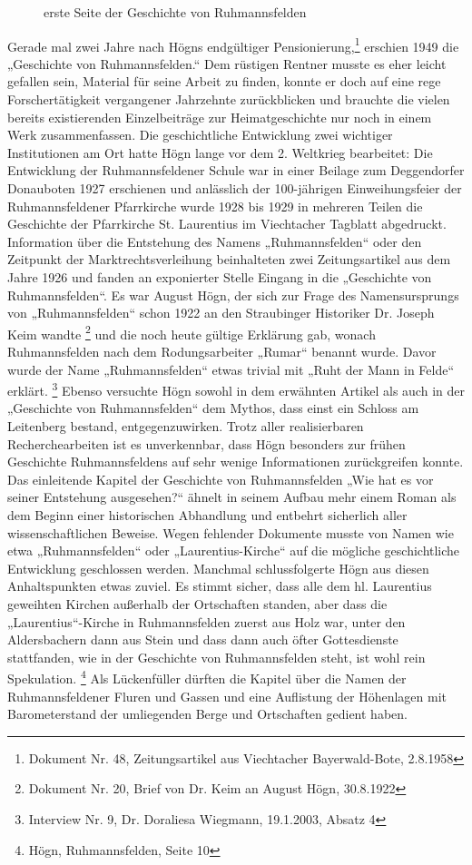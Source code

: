 \begin{figure}
\caption{erste Seite der Geschichte von Ruhmannsfelden}
\end{figure}

Gerade mal zwei Jahre nach Högns endgültiger Pensionierung,\footnote{
Dokument Nr. 48, Zeitungsartikel aus Viechtacher Bayerwald-Bote,
2.8.1958} erschien 1949 die „Geschichte von Ruhmannsfelden.“ Dem
rüstigen Rentner musste es eher leicht gefallen sein, Material für
seine Arbeit zu finden, konnte er doch auf eine rege Forschertätigkeit
vergangener Jahrzehnte zurückblicken und brauchte die vielen bereits
existierenden Einzelbeiträge zur Heimatgeschichte nur noch in einem
Werk zusammenfassen. Die geschichtliche Entwicklung zwei wichtiger
Institutionen am Ort hatte Högn lange vor dem 2. Weltkrieg bearbeitet:
Die Entwicklung der Ruhmannsfeldener Schule war in einer Beilage zum
Deggendorfer Donauboten 1927 erschienen und anlässlich der 100-jährigen
Einweihungsfeier der Ruhmannsfeldener Pfarrkirche wurde 1928 bis 1929
in mehreren Teilen die Geschichte der Pfarrkirche St. Laurentius im
Viechtacher Tagblatt abgedruckt. Information über die Entstehung des
Namens „Ruhmannsfelden“ oder den Zeitpunkt der Marktrechtsverleihung
beinhalteten zwei Zeitungsartikel aus dem Jahre 1926 und fanden an
exponierter Stelle Eingang in die „Geschichte von Ruhmannsfelden“. Es
war August Högn, der sich zur Frage des Namensursprungs von
„Ruhmannsfelden“ schon 1922 an den Straubinger Historiker Dr. Joseph
Keim wandte \footnote{Dokument Nr. 20, Brief von Dr. Keim an August
Högn, 30.8.1922} und die noch heute gültige Erklärung gab, wonach
Ruhmannsfelden nach dem Rodungsarbeiter „Rumar“ benannt wurde. Davor
wurde der Name „Ruhmannsfelden“ etwas trivial mit „Ruht der Mann in
Felde“ erklärt. \footnote{Interview Nr. 9, Dr. Doraliesa Wiegmann,
19.1.2003, Absatz 4} Ebenso versuchte Högn sowohl in dem erwähnten
Artikel als auch in der „Geschichte von Ruhmannsfelden“ dem Mythos,
dass einst ein Schloss am Leitenberg bestand, entgegenzuwirken. Trotz
aller realisierbaren Recherchearbeiten ist es unverkennbar, dass Högn
besonders zur frühen Geschichte Ruhmannsfeldens auf sehr wenige
Informationen zurückgreifen konnte. Das einleitende Kapitel der
Geschichte von Ruhmannsfelden „Wie hat es vor seiner Entstehung
ausgesehen?“ ähnelt in seinem Aufbau mehr einem Roman als dem Beginn
einer historischen Abhandlung und entbehrt sicherlich aller
wissenschaftlichen Beweise. Wegen fehlender Dokumente musste von Namen
wie etwa „Ruhmannsfelden“ oder „Laurentius-Kirche“ auf die mögliche
geschichtliche Entwicklung geschlossen werden. Manchmal schlussfolgerte
Högn aus diesen Anhaltspunkten etwas zuviel. Es stimmt sicher, dass
alle dem hl. Laurentius geweihten Kirchen außerhalb der Ortschaften
standen, aber dass die „Laurentius“-Kirche in Ruhmannsfelden zuerst aus
Holz war, unter den Aldersbachern dann aus Stein und dass dann auch
öfter Gottesdienste stattfanden, wie in der Geschichte von
Ruhmannsfelden steht, ist wohl rein Spekulation. \footnote{Högn,
Ruhmannsfelden, Seite 10} Als Lückenfüller dürften die Kapitel über die
Namen der Ruhmannsfeldener Fluren und Gassen und eine Auflistung der
Höhenlagen mit Barometerstand der umliegenden Berge und Ortschaften
gedient haben.

